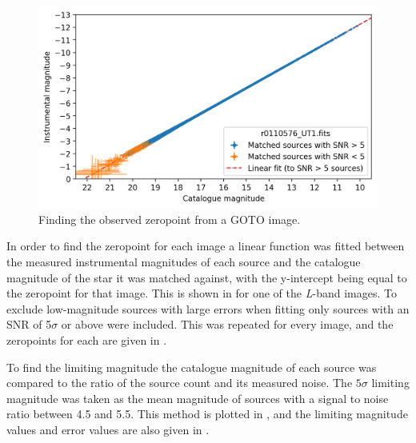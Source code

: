 \begin{colsection}
\begin{colsection}
\begin{figure}[t]
    \begin{center}
        \includegraphics[width=\textwidth]{images/throughput/zeropoint_real.png}
    \end{center}
    \caption[Finding the observed zeropoint from a GOTO image]{
        Finding the observed zeropoint from a GOTO image.
    }\label{fig:zeropoint}
\end{figure}

In order to find the zeropoint for each image a linear function was fitted between the measured instrumental magnitudes of each source and the catalogue magnitude of the star it was matched against, with the y-intercept being equal to the zeropoint for that image. This is shown in  for one of the \textit{L}-band images. To exclude low-magnitude sources with large errors when fitting only sources with an SNR of 5$\sigma$ or above were included. This was repeated for every image, and the zeropoints for each are given in .

To find the limiting magnitude the catalogue magnitude of each source was compared to the ratio of the source count and its measured noise. The $5\sigma$ limiting magnitude was taken as the mean magnitude of sources with a signal to noise ratio between 4.5 and 5.5. This method is plotted in , and the limiting magnitude values and error values are also given in .

\newpage


\end{colsection}
\end{colsection}
